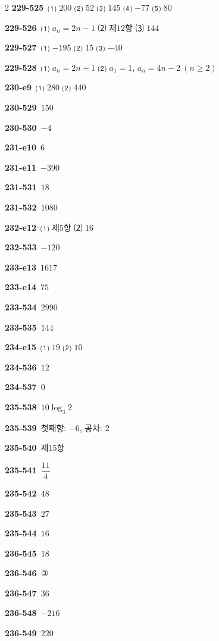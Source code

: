 \documentclass[10pt,a4paper]{article}
\begin{document}
\begin{multicols}{2}
\noindent\textbf{229-525}\ ⑴ $200$ ⑵ $52$ ⑶ $145$ ⑷ $-77$ ⑸ $80$\par
\noindent\textbf{229-526}\ ⑴ $a_n=2n-1$ ⑵ 제$12$항 ⑶ $144$\par
\noindent\textbf{229-527}\ ⑴ $-195$ ⑵ $15$ ⑶ $-40$\par
\noindent\textbf{229-528}\ ⑴ $a_n=2n+1$ ⑵ $a_1=1$, $a_n=4n-2\ (n\ge 2)$\par
\noindent\textbf{230-e9}\ ⑴ $280$ ⑵ $440$\par
\noindent\textbf{230-529}\ $150$\par
\noindent\textbf{230-530}\ $-4$\par
\noindent\textbf{231-e10}\ $6$\par
\noindent\textbf{231-e11}\ $-390$\par
\noindent\textbf{231-531}\ $18$\par
\noindent\textbf{231-532}\ $1080$\par
\noindent\textbf{232-e12}\ ⑴ 제$5$항 ⑵ $16$\par
\noindent\textbf{232-533}\ $-120$\par
\noindent\textbf{233-e13}\ $1617$\par
\noindent\textbf{233-e14}\ $75$\par
\noindent\textbf{233-534}\ $2990$\par
\noindent\textbf{233-535}\ $144$\par
\noindent\textbf{234-e15}\ ⑴ $19$ ⑵ $10$\par
\noindent\textbf{234-536}\ $12$\par
\noindent\textbf{234-537}\ $0$\par
\noindent\textbf{235-538}\ $10\log_3 2$\par
\noindent\textbf{235-539}\ 첫째항: $-6$, 공차: $2$\par
\noindent\textbf{235-540}\ 제$15$항\par
\noindent\textbf{235-541}\ $\dfrac{11}{4}$\par
\noindent\textbf{235-542}\ $48$\par
\noindent\textbf{235-543}\ $27$\par
\noindent\textbf{235-544}\ $16$\par
\noindent\textbf{236-545}\ $18$\par
\noindent\textbf{236-546}\ ③\par
\noindent\textbf{236-547}\ $36$\par
\noindent\textbf{236-548}\ $-216$\par
\noindent\textbf{236-549}\ $220$\par

\end{multicols}
\end{document}
